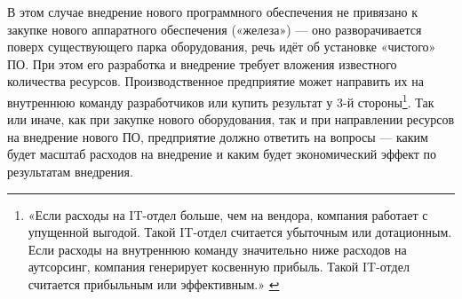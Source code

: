 \documentclass{article}
\begin{document}
В этом случае внедрение нового программного обеспечения не привязано к закупке нового аппаратного обеспечения («железа») — оно разворачивается поверх существующего парка оборудования, речь идёт об установке «чистого» ПО. При этом его разработка и внедрение требует вложения известного количества ресурсов. Производственное предприятие может направить их на внутреннюю команду разработчиков или купить результат у 3-й стороны\footnote{«Если расходы на IT-отдел больше, чем на вендора, компания работает с упущенной выгодой. Такой IT-отдел считается убыточным или дотационным. Если расходы на внутреннюю команду значительно ниже расходов на аутсорсинг, компания генерирует косвенную прибыль. Такой IT-отдел считается прибыльным или эффективным.» \cite{itProfit2023}}. Так или иначе, как при закупке нового оборудования, так и при направлении ресурсов на внедрение нового ПО, предприятие должно ответить на вопросы — каким будет масштаб расходов на внедрение и каким будет экономический эффект по результатам внедрения.
\end{document}
